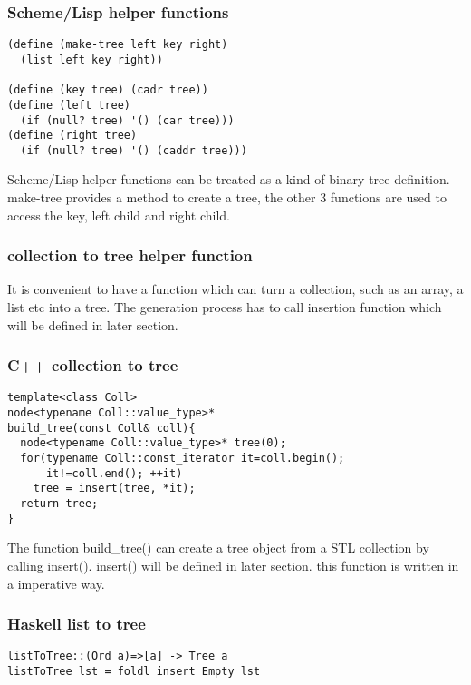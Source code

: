 \documentclass{article}
\begin{document}
\subsubsection*{Scheme/Lisp helper functions}
\lstset{language=Lisp}
\begin{lstlisting}
(define (make-tree left key right)
  (list left key right))

(define (key tree) (cadr tree))
(define (left tree) 
  (if (null? tree) '() (car tree)))
(define (right tree) 
  (if (null? tree) '() (caddr tree)))
\end{lstlisting}

Scheme/Lisp helper functions can be treated as a kind of binary tree
definition. make-tree provides a method to create a tree, the other
3 functions are used to access the key, left child and right child.

\subsubsection{collection to tree helper function} \label{list2tree}
It is convenient to have a function which can turn a collection, such as
an array, a list etc into a tree. The generation process has to call insertion
function which will be defined in later section.

\subsubsection*{C++ collection to tree}
\lstset{language=C++}
\begin{lstlisting}
template<class Coll>
node<typename Coll::value_type>* 
build_tree(const Coll& coll){
  node<typename Coll::value_type>* tree(0);
  for(typename Coll::const_iterator it=coll.begin(); 
      it!=coll.end(); ++it)
    tree = insert(tree, *it);
  return tree;
}
\end{lstlisting}

The function build\_tree() can create a tree object from a STL collection 
by calling insert(). insert() will be defined in later section. this function
is written in a imperative way.

\subsubsection*{Haskell list to tree}
\lstset{language=Haskell}
\begin{lstlisting}
listToTree::(Ord a)=>[a] -> Tree a
listToTree lst = foldl insert Empty lst
\end{lstlisting}
\end{document}
